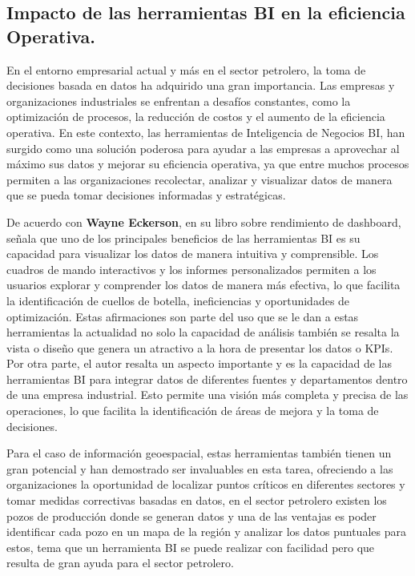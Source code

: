 \documentclass[
  11pt,
  bookmarksnumbered]{article}
\begin{document}
\hypertarget{impacto-de-las-herramientas-bi-en-la-eficiencia-operativa.}{%
\subsection{Impacto de las herramientas BI en la eficiencia Operativa.}\label{impacto-de-las-herramientas-bi-en-la-eficiencia-operativa.}}

En el entorno empresarial actual y más en el sector petrolero, la toma de decisiones basada en datos ha adquirido una gran importancia.
Las empresas y organizaciones industriales se enfrentan a desafíos constantes, como la optimización de procesos, la reducción de costos y el aumento de la eficiencia operativa.
En este contexto, las herramientas de Inteligencia de Negocios BI, han surgido como una solución poderosa para ayudar a las empresas a aprovechar al máximo sus datos y mejorar su eficiencia operativa, ya que entre muchos procesos permiten a las organizaciones recolectar, analizar y visualizar datos de manera que se pueda tomar decisiones informadas y estratégicas.

De acuerdo con \textbf{Wayne Eckerson}, \textcite{eckerson2010performance} en su libro sobre rendimiento de dashboard, señala que uno de los principales beneficios de las herramientas BI es su capacidad para visualizar los datos de manera intuitiva y comprensible.
Los cuadros de mando interactivos y los informes personalizados permiten a los usuarios explorar y comprender los datos de manera más efectiva, lo que facilita la identificación de cuellos de botella, ineficiencias y oportunidades de optimización.
Estas afirmaciones son parte del uso que se le dan a estas herramientas la actualidad no solo la capacidad de análisis también se resalta la vista o diseño que genera un atractivo a la hora de presentar los datos o KPIs.
Por otra parte, el autor resalta un aspecto importante y es la capacidad de las herramientas BI para integrar datos de diferentes fuentes y departamentos dentro de una empresa industrial.
Esto permite una visión más completa y precisa de las operaciones, lo que facilita la identificación de áreas de mejora y la toma de decisiones.

Para el caso de información geoespacial, estas herramientas también tienen un gran potencial y han demostrado ser invaluables en esta tarea, ofreciendo a las organizaciones la oportunidad de localizar puntos críticos en diferentes sectores y tomar medidas correctivas basadas en datos, en el sector petrolero existen los pozos de producción donde se generan datos y una de las ventajas es poder identificar cada pozo en un mapa de la región y analizar los datos puntuales para estos, tema que un herramienta BI se puede realizar con facilidad pero que resulta de gran ayuda para el sector petrolero.
\end{document}
